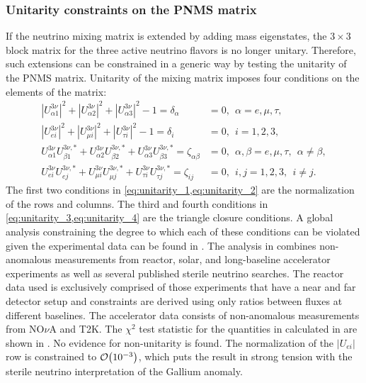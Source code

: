 \subsubsection{Unitarity constraints on the PNMS matrix}
If the neutrino mixing matrix is extended by adding mass eigenstates, the $3\times3$ block matrix for the three active neutrino flavors is no longer unitary. Therefore, such extensions can be constrained in a generic way by testing the unitarity of the PNMS matrix. Unitarity of the mixing matrix imposes four conditions on the elements of the matrix:
\begin{align}
    |U^{3\nu}_{\alpha 1}|^2 + |U^{3\nu}_{\alpha 2}|^2 + |U^{3\nu}_{\alpha 3}|^2 - 1 = \delta_\alpha &= 0,~~\alpha=e,\mu,\tau, \label{eq:unitarity_1}
    \\
    |U^{3\nu}_{e i}|^2 + |U^{3\nu}_{\mu i}|^2 + |U^{3\nu}_{\tau i}|^2 -1 = \delta_i &= 0,~~i=1,2,3, \label{eq:unitarity_2}
    \\
    U^{3\nu}_{\alpha 1}U^{3\nu,*}_{\beta 1} + U^{3\nu}_{\alpha 2}U^{3\nu,*}_{\beta 2} + U^{3\nu}_{\alpha 3}U^{3\nu,*}_{\beta 3} = \zeta_{\alpha\beta} &= 0,~~\alpha, \beta = e,\mu,\tau,~~\alpha\neq\beta, \label{eq:unitarity_3}
    \\
    U^{3\nu}_{e i}U^{3\nu,*}_{e j} + U^{3\nu}_{\mu i}U^{3\nu,*}_{\mu j} + U^{3\nu}_{\tau i}U^{3\nu,*}_{\tau j} = \zeta_{ij} &= 0,~~i,j  =1,2,3,~~i\neq j. \label{eq:unitarity_4}
\end{align}
The first two conditions in \cref{eq:unitarity_1,eq:unitarity_2} are the normalization of the rows and columns. The third and fourth conditions in \cref{eq:unitarity_3,eq:unitarity_4} are the triangle closure conditions. A global analysis constraining the degree to which each of these conditions can be violated given the experimental data can be found in . The analysis in \cite{global_unitarity_Hu} combines non-anomalous measurements from reactor, solar, and long-baseline accelerator experiments as well as several published sterile neutrino searches. The reactor data used is exclusively comprised of those experiments that have a near and far detector setup and constraints are derived using only ratios between fluxes at different baselines. The accelerator data consists of non-anomalous measurements from NO$\nu$A and T2K. The $\chi^2$ test statistic for the quantities in  calculated in \cite{global_unitarity_Hu} are shown in . No evidence for non-unitarity is found. The normalization of the $|U_{ei}|$ row is constrained to $\order{\num{e-3}}$, which puts the result in strong tension with the sterile neutrino interpretation of the Gallium anomaly.
